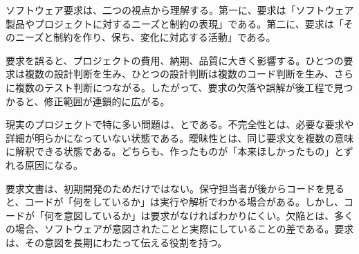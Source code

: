 ソフトウェア要求は、二つの視点から理解する。第一に、要求は「ソフトウェア製品やプロジェクトに対するニーズと制約の表現」である。第二に、要求は「そのニーズと制約を作り、保ち、変化に対応する活動」である。

要求を誤ると、プロジェクトの費用、納期、品質に大きく影響する。ひとつの要求は複数の設計判断を生み、ひとつの設計判断は複数のコード判断を生み、さらに複数のテスト判断につながる。したがって、要求の欠落や誤解が後工程で見つかると、修正範囲が連鎖的に広がる。

現実のプロジェクトで特に多い問題は、とである。不完全性とは、必要な要求や詳細が明らかになっていない状態である。曖昧性とは、同じ要求文を複数の意味に解釈できる状態である。どちらも、作ったものが「本来ほしかったもの」とずれる原因になる。

要求文書は、初期開発のためだけではない。保守担当者が後からコードを見ると、コードが「何をしているか」は実行や解析でわかる場合がある。しかし、コードが「何を意図しているか」は要求がなければわかりにくい。欠陥とは、多くの場合、ソフトウェアが意図されたことと実際にしていることの差である。要求は、その意図を長期にわたって伝える役割を持つ。

